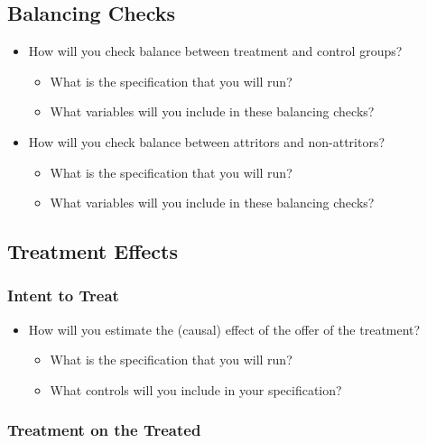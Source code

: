 \documentclass[
  letterpaper,
  DIV=11,
  numbers=noendperiod]{scrartcl}
\providecommand{\tightlist}{%
  \setlength{\itemsep}{0pt}\setlength{\parskip}{0pt}}\usepackage{longtable,booktabs,array}
\begin{document}
\subsection{Balancing Checks}\label{balancing-checks}

\begin{itemize}
\tightlist
\item
  How will you check balance between treatment and control groups?

  \begin{itemize}
  \tightlist
  \item
    What is the specification that you will run?
  \item
    What variables will you include in these balancing checks?
  \end{itemize}
\item
  How will you check balance between attritors and non-attritors?

  \begin{itemize}
  \tightlist
  \item
    What is the specification that you will run?
  \item
    What variables will you include in these balancing checks?
  \end{itemize}
\end{itemize}

\subsection{Treatment Effects}\label{treatment-effects}

\subsubsection{Intent to Treat}\label{intent-to-treat}

\begin{itemize}
\tightlist
\item
  How will you estimate the (causal) effect of the offer of the
  treatment?

  \begin{itemize}
  \tightlist
  \item
    What is the specification that you will run?
  \item
    What controls will you include in your specification?
  \end{itemize}
\end{itemize}

\subsubsection{Treatment on the Treated}\label{treatment-on-the-treated}
\end{document}
